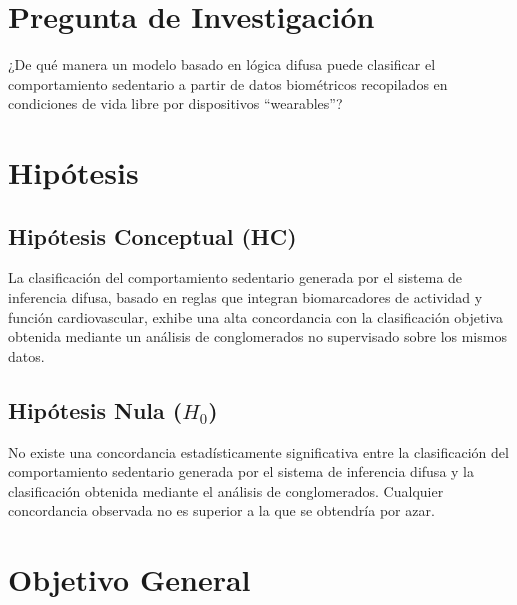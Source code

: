 \section{Pregunta de Investigación}
\label{sec:pregunta_investigacion}

¿De qué manera un modelo basado en lógica difusa puede clasificar el comportamiento sedentario a partir de datos biométricos recopilados en condiciones de vida libre por dispositivos ``wearables''?

\section{Hipótesis}
\label{sec:hipotesis}

\subsection{Hipótesis Conceptual (HC)}
\label{subsec:hipotesis_conceptual}

La clasificación del comportamiento sedentario generada por el sistema de inferencia difusa, basado en reglas que integran biomarcadores de actividad y función cardiovascular, exhibe una alta concordancia con la clasificación objetiva obtenida mediante un análisis de conglomerados no supervisado sobre los mismos datos.

\subsection{Hipótesis Nula ($H_0$)}
\label{subsec:hipotesis_nula}

No existe una concordancia estadísticamente significativa entre la clasificación del comportamiento sedentario generada por el sistema de inferencia difusa y la clasificación obtenida mediante el análisis de conglomerados. Cualquier concordancia observada no es superior a la que se obtendría por azar.

\section{Objetivo General}
\label{sec:objetivo_general}

